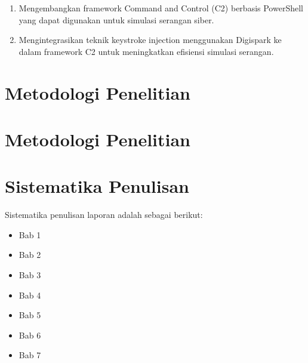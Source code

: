 \begin{enumerate}
    \item Mengembangkan framework Command and Control (C2) berbasis PowerShell yang dapat digunakan untuk simulasi serangan siber.
    \item Mengintegrasikan teknik keystroke injection menggunakan Digispark ke dalam framework C2 untuk meningkatkan efisiensi simulasi serangan.
\end{enumerate}

\section{Metodologi Penelitian}


\section{Metodologi Penelitian}


\section{Sistematika Penulisan}
Sistematika penulisan laporan adalah sebagai berikut:
\begin{itemize}
	\item Bab 1 \babSatu \\
	\item Bab 2 \babDua \\
	\item Bab 3 \babTiga \\
	\item Bab 4 \babEmpat \\
	\item Bab 5 \babLima \\
	\item Bab 6 \babEnam \\
	\item Bab 7 \kesimpulan \\
\end{itemize}


